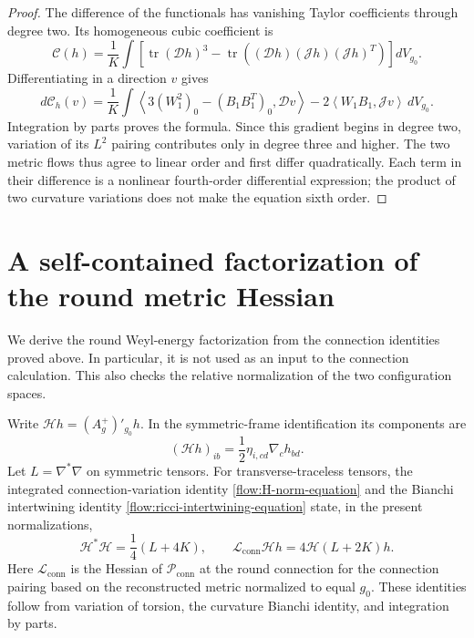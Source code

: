 \documentclass[11pt]{article}
\numberwithin{equation}{section}
\theoremstyle{definition}
\theoremstyle{remark}
\begin{document}
\begin{proof}
The difference of the functionals has vanishing Taylor coefficients
through degree two. Its homogeneous cubic coefficient is
\[
 \mathcal C(h)=\frac1K\int
 \left[\operatorname{tr}(\mathcal Dh)^3
 -\operatorname{tr}\left((\mathcal Dh)(\mathcal Jh)(\mathcal Jh)^T\right)
 \right]dV_{g_0}.
\]
Differentiating in a direction $v$ gives
\[
 d\mathcal C_h(v)=\frac1K\int
 \left\langle3(W_1^2)_0-(B_1B_1^T)_0,\mathcal Dv\right\rangle
 -2\left\langle W_1B_1,\mathcal Jv\right\rangle\,dV_{g_0}.
\]
Integration by parts proves the formula. Since this gradient begins in
degree two, variation of its $L^2$ pairing contributes only in degree
three and higher. The two metric flows thus agree to linear order and
first differ quadratically. Each term in their difference is a nonlinear
fourth-order differential expression; the product of two curvature
variations does not make the equation sixth order.
\end{proof}

\section{A self-contained factorization of the round metric Hessian}
\label{sec:metric-hessian}

We derive the round Weyl-energy factorization from the connection
identities proved above. In particular, it is not used as an input to
the connection calculation. This also checks the relative normalization
of the two configuration spaces.

Write $\mathcal Hh=(A_g^+)'_{g_0}h$. In the symmetric-frame
identification its components are
\begin{equation}\label{metric:H-definition}
 (\mathcal Hh)_{ib}=\frac12\eta_{i,cd}\nabla_ch_{bd}.
\end{equation}
Let $L=\nabla^*\nabla$ on symmetric tensors. For transverse-traceless
tensors, the integrated connection-variation identity
\eqref{flow:H-norm-equation} and the Bianchi intertwining identity
\eqref{flow:ricci-intertwining-equation} state, in the present normalizations,
\begin{equation}\label{metric:H-identities}
 \mathcal H^*\mathcal H=\frac14(L+4K),\qquad
 \mathcal L_{\mathrm{conn}}\mathcal Hh
 =4\mathcal H(L+2K)h.
\end{equation}
Here $\mathcal L_{\mathrm{conn}}$ is the Hessian of
$\mathcal P_{\mathrm{conn}}$ at the round connection for the connection
pairing based on the reconstructed metric normalized to equal $g_0$.
These identities follow from variation of torsion,
the curvature Bianchi identity, and integration by parts.
\end{document}
